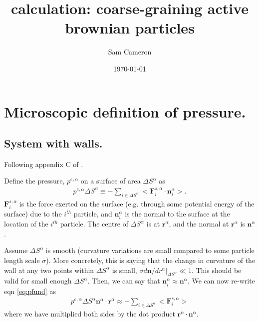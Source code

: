 \documentclass[twocolumn,amsmath,amssymb,aps]{revtex4-1}%
\begin{document}
 
\title{calculation: coarse-graining active brownian particles}
\author{Sam Cameron}
%
\date{\today}

\begin{abstract}
\end{abstract}

\maketitle

\section{Microscopic definition of pressure.}
\subsection{System with walls.}

Following appendix C of \cite{C5SM01412C}.

Define the pressure, $p^{e,\alpha}$ on a surface of area
$\Delta S^{\alpha}$ as
\begin{align}\label{eq:pfund}
  p^{e,\alpha}\Delta S^{\alpha}
  \equiv -\sum_{i\in\Delta S^{\alpha}}
  <\bm{F}_i^{s,{\alpha}}\cdot\bm{n}_i^{\alpha}>.
\end{align}
$\bm{F}_i^{s,{\alpha}}$ is the force exerted on the surface
(e.g. through some potential energy of the surface) due to
the $i^{th}$ particle, and $\bm{n}_i^{\alpha}$ is the normal
to the surface at the location of the $i^{th}$ particle. The
centre of $\Delta S^{\alpha}$ is at $\bm{r}^{\alpha}$, and
the normal at $\bm{r}^{\alpha}$ is $\bm{n}^{\alpha}$.

Assume $\Delta S^{\alpha}$ is smooth (curvature variations
are small compared to some particle length scale $\sigma$).
More concretely, this is saying that the change in curvature
of the wall at any two points within $\Delta S^{\alpha}$ is
small, $\sigma d\bm{n}/dr^{\alpha}|_{\Delta S^{\alpha}}\ll 1$.
This should be valid for small enough $\Delta S^{\alpha}$.
Then, we can say that
$\bm{n}_i^{\alpha}\approx\bm{n}^{\alpha}$. We can now re-write
eqn \ref{eq:pfund} as
\begin{align}
  p^{e,\alpha}\Delta S^{\alpha}\bm{n}^{\alpha}
  \cdot\bm{r}^{\alpha}
  \approx -\sum_{i\in\Delta S^{\alpha}}<\bm{F}_i^{s,\alpha}>
\end{align}
where we have multiplied both sides by the dot product
$\bm{r}^{\alpha}\cdot\bm{n}^{\alpha}$.
\end{document}
